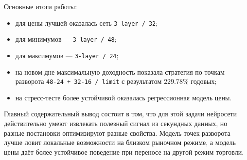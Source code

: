 \documentclass[12pt,a4paper]{article}
\begin{document}
Основные итоги работы:
\begin{itemize}
    \item для цены лучшей оказалась сеть \texttt{3-layer / 32};
    \item для минимумов --- \texttt{3-layer / 48};
    \item для максимумов --- \texttt{3-layer / 24};
    \item на новом дне максимальную доходность показала стратегия по точкам разворота \texttt{48-24 + 32-16 / limit} с результатом \(229.78\%\) годовых;
    \item на стресс-тесте более устойчивой оказалась регрессионная модель цены.
\end{itemize}

Главный содержательный вывод состоит в том, что для этой задачи нейросети действительно умеют извлекать полезный сигнал из секундных данных, но разные постановки оптимизируют разные свойства. Модель точек разворота лучше ловит локальные возможности на близком рыночном режиме, а модель цены даёт более устойчивое поведение при переносе на другой режим торговли.
\end{document}
